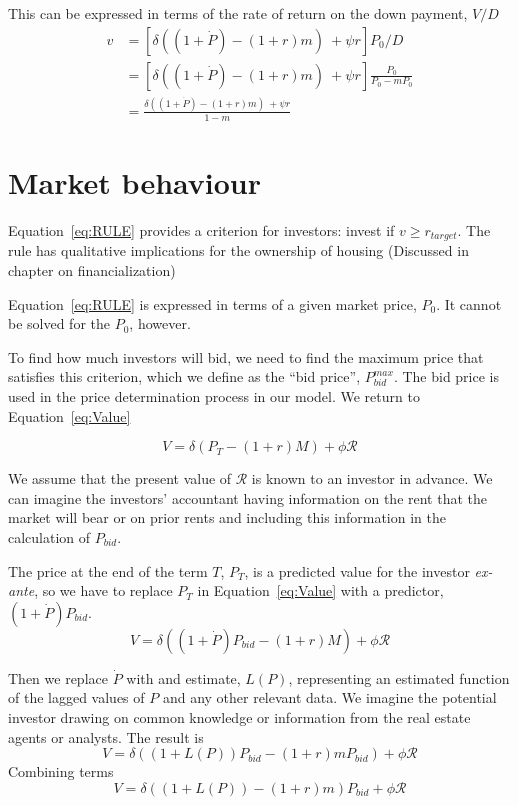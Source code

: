 This can be expressed in terms of the rate of return on the down payment, $V/D$
\begin{align}  
   v & = \left[ \delta ((1+\dot P)  - (1+r)m)\  + \psi r\right]P_0/D\\
    & = \left[ \delta ((1+\dot P)  - (1+r)m)\  + \psi r\right] \frac{P_0}{P_0-mP_0}\\
    & =  \frac{\delta ((1+\dot P)  - (1+r)m)\  + \psi r}{1-m}\label{eq:RULE}
\end{align}

\section{Market behaviour}
Equation~\ref{eq:RULE} provides a criterion for investors: invest if $v \geq r_{target}$. The rule has qualitative implications for the ownership of housing (Discussed in chapter on financialization)


Equation~\ref{eq:RULE} is expressed in terms of a given market price, $P_0$. It cannot be solved for the $P_0$, however.

To find how much investors will bid, we need to find the maximum price that satisfies this criterion, which we define as the ``bid price'', $P^{max}_{bid}$.   The bid price is used in the price determination process in our model. We return to Equation~\ref{eq:Value} %

\[V= \delta(P_T- (1+r)M)   +\phi  \mathcal{R}\]


We assume that the present value of $\mathcal{R}$ is known to an investor in advance. We can imagine the investors' accountant having information on the rent that the market will bear or on prior rents and including this information in the calculation of $P_{bid}$.

The  price at the end of the term $T$,  $P_T$, is a predicted value  for the investor \textit{ex-ante}, so we have to replace $P_T$ in Equation~\ref{eq:Value} with a predictor, $(1+\dot P)P_{bid}$. 
\[V= \delta((1+\dot P)P_{bid}- (1+r)M)   +\phi  \mathcal{R}\]

Then we replace $\dot P$ with and estimate, $L(P)$, representing an estimated function of the lagged values of $P$ and any  other relevant data. We imagine the potential investor drawing on common  knowledge or information from the real estate agents or analysts.  The result is 
\[V= \delta((1+L(P))P_{bid}- (1+r)mP_{bid})   +\phi \mathcal{R}\]
Combining terms
\[V= \delta((1+L(P))- (1+r)m)P_{bid}   +\phi \mathcal{R}\]

